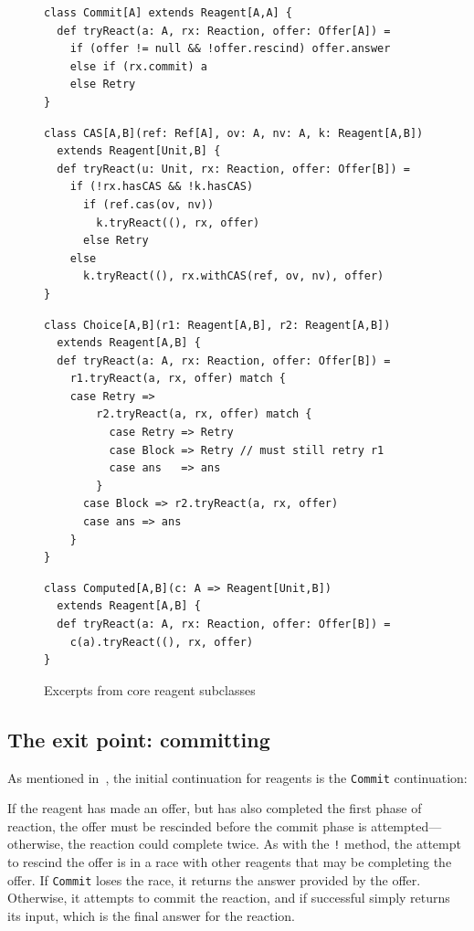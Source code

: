 \documentclass[preprint,nocopyrightspace]{sigplanconf}
\begin{document}
\begin{figure}
\begin{lstlisting}[frame=single]
class Commit[A] extends Reagent[A,A] {
  def tryReact(a: A, rx: Reaction, offer: Offer[A]) = 
    if (offer != null && !offer.rescind) offer.answer
    else if (rx.commit) a 
    else Retry
}
\end{lstlisting}
\vskip -12pt
\begin{lstlisting}[frame=single]
class CAS[A,B](ref: Ref[A], ov: A, nv: A, k: Reagent[A,B]) 
  extends Reagent[Unit,B] {
  def tryReact(u: Unit, rx: Reaction, offer: Offer[B]) = 
    if (!rx.hasCAS && !k.hasCAS)
      if (ref.cas(ov, nv))
        k.tryReact((), rx, offer)
      else Retry
    else
      k.tryReact((), rx.withCAS(ref, ov, nv), offer)
}
\end{lstlisting}
\vskip -12pt
\begin{lstlisting}[frame=single]
class Choice[A,B](r1: Reagent[A,B], r2: Reagent[A,B]) 
  extends Reagent[A,B] {
  def tryReact(a: A, rx: Reaction, offer: Offer[B]) = 
    r1.tryReact(a, rx, offer) match {
    case Retry => 
        r2.tryReact(a, rx, offer) match {
          case Retry => Retry
          case Block => Retry // must still retry r1
          case ans   => ans
        }
      case Block => r2.tryReact(a, rx, offer)
      case ans => ans
    }
}
\end{lstlisting}
\vskip -12pt
\begin{lstlisting}[frame=single]
class Computed[A,B](c: A => Reagent[Unit,B]) 
  extends Reagent[A,B] {
  def tryReact(a: A, rx: Reaction, offer: Offer[B]) = 
    c(a).tryReact((), rx, offer)
}
\end{lstlisting}
\nocaptionrule
\caption{Excerpts from core reagent subclasses}
\end{figure}

\subsection{The exit point: committing}
\label{sec:impl-commit}

As mentioned in~, the initial continuation for reagents is the
\lstinline{Commit} continuation:


If the reagent has made an offer, but has also completed the first phase of
reaction, the offer must be rescinded before the commit phase is
attempted---otherwise, the reaction could complete twice.  As with the
\lstinline{!} method, the attempt to rescind the offer is in a race with other
reagents that may be completing the offer.  If \lstinline{Commit} loses the
race, it returns the answer provided by the offer.  Otherwise, it attempts to
commit the reaction, and if successful simply returns its input, which is the
final answer for the reaction.
\end{document}
